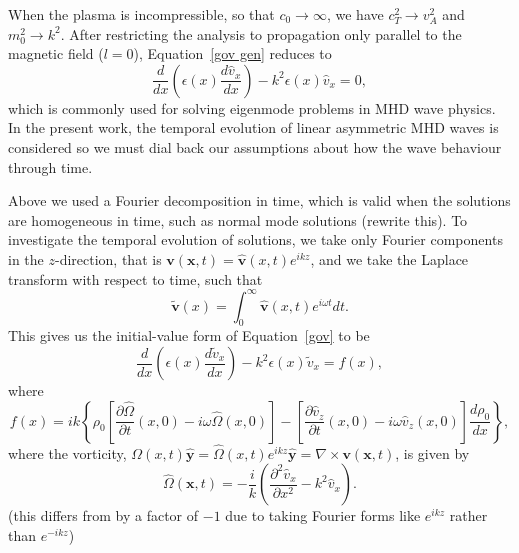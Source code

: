 \documentclass{aastex61}
\begin{document}
When the plasma is incompressible, so that $c_0 \to \infty$, we have $c_T^2 \to v_A^2$ and $m_0^2 \to k^2$. After restricting the analysis to propagation only parallel to the magnetic field ($l = 0$), Equation~\eqref{gov gen} reduces to
\begin{equation}
\frac{d}{dx}\left(\epsilon(x) \frac{d\hat{v}_x}{dx}\right) - k^2\epsilon(x)\hat{v}_x = 0,
\label{gov}
\end{equation}
which is commonly used for solving eigenmode problems in MHD wave physics. In the present work, the temporal evolution of linear asymmetric MHD waves is considered so we must dial back our assumptions about how the wave behaviour through time.

Above we used a Fourier decomposition in time, which is valid when the solutions are homogeneous in time, such as normal mode solutions (rewrite this). To investigate the temporal evolution of solutions, we take only Fourier components in the $z$-direction, that is $\mathbf{v}(\mathbf{x},t) = \mathbf{\hat{v}}(x,t)e^{ikz}$, and we take the Laplace transform with respect to time, such that
\begin{equation}
\mathbf{\tilde{v}}(x) = \int_0^\infty \mathbf{\widehat{v}}(x,t)e^{i\omega t} dt.
\end{equation}
This gives us the initial-value form of Equation~\eqref{gov} to be
\begin{equation}
\frac{d}{dx}\left(\epsilon(x) \frac{d\tilde{v}_x}{dx}\right) - k^2\epsilon(x)\tilde{v}_x = f(x),
\label{ivp gov}
\end{equation}
where
\begin{equation}
f(x) = ik\left\{\rho_0\left[\frac{\partial\hat{\Omega}}{\partial t}(x,0) - i\omega\hat{\Omega}(x,0)\right] - \left[\frac{\partial\hat{v}_z}{\partial t}(x,0) - i\omega \hat{v}_z(x,0)\right]\frac{d\rho_0}{dx}\right\},
\label{f}
\end{equation}
where the vorticity, $\Omega(x,t)\mathbf{\hat{y}} = \hat{\Omega}(x,t)e^{ikz}\mathbf{\hat{y}} = \nabla \times \mathbf{v}(\mathbf{x},t)$, is given by
\begin{equation}
\hat{\Omega}(\mathbf{x},t) = -\frac{i}{k}\left(\frac{\partial^2\hat{v}_x}{\partial x^2} - k^2 \hat{v}_x\right).
\end{equation}
(this differs from \cite{rae_etal81} by a factor of $-1$ due to taking Fourier forms like $e^{ikz}$ rather than $e^{-ikz}$)
\end{document}
